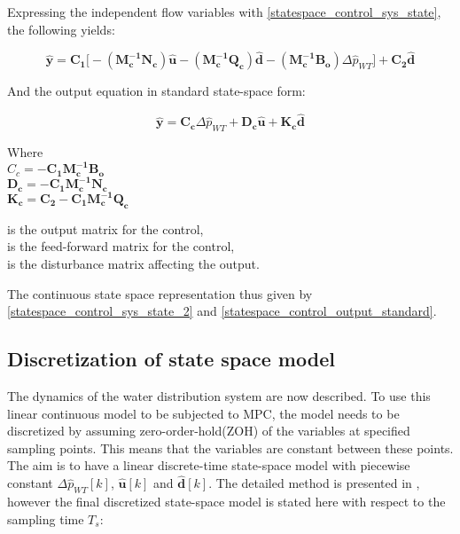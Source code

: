 Expressing the independent flow variables with \eqref{statespace_control_sys_state}, the following yields: 

\begin{equation}
  \pmb{\hat{y}} = \pmb{C_1} \big[- (\pmb{M_c^{-1}}\pmb{N_c}) \pmb{\hat{u}} - (\pmb{M_c^{-1}}\pmb{Q_c}) \pmb{\hat{d}} - (\pmb{M_c^{-1}}\pmb{B_o}) \Delta \hat{p}_{WT}\big] + \pmb{C_2} \pmb{\hat{d}}  
   \label{statespace_control_output}
\end{equation}

And the output equation in standard state-space form:

\begin{equation}
  \pmb{\hat{y}} = \pmb{C_c} \Delta \hat{p}_{WT} + \pmb{D_c} \pmb{\hat{u}} + \pmb{K_c} \pmb{\hat{d}}
\label{statespace_control_output_standard}
\end{equation}

\begin{minipage}[t]{0.40\textwidth}
Where\\
\hspace*{8mm} $C_c = -\pmb{C_1}\pmb{M_c^{-1}}\pmb{B_o} $ \\
\hspace*{8mm} $\pmb{D_c} = - \pmb{C_1}\pmb{M_c^{-1}}\pmb{N_c} $ \\
\hspace*{8mm} $\pmb{K_c} = \pmb{C_2} -\pmb{C_1}\pmb{M_c^{-1}}\pmb{Q_c} $
\end{minipage}
\begin{minipage}[t]{0.48\textwidth}
\vspace*{1mm}
is the output matrix for the control, \\
is the feed-forward matrix for the control, \\
is the disturbance matrix affecting the output.
\end{minipage} 

The continuous state space representation thus given by \eqref{statespace_control_sys_state_2} and \eqref{statespace_control_output_standard}.

\subsection{Discretization of state space model}
 \label{discrete_SS}
 
The dynamics of the water distribution system are now described. To use this linear continuous model to be subjected to MPC, the model needs to be discretized by assuming zero-order-hold(ZOH) of the variables at specified sampling points. This means that the variables are constant between these points. The aim is to have a linear discrete-time state-space model with piecewise constant $\Delta \hat{p}_{WT}[k]$, $\pmb{\hat{u}}[k]$ and $\pmb{\hat{d}}[k]$. The detailed method is presented in , however the final discretized state-space model is stated here with respect to the sampling time $T_s$: 


